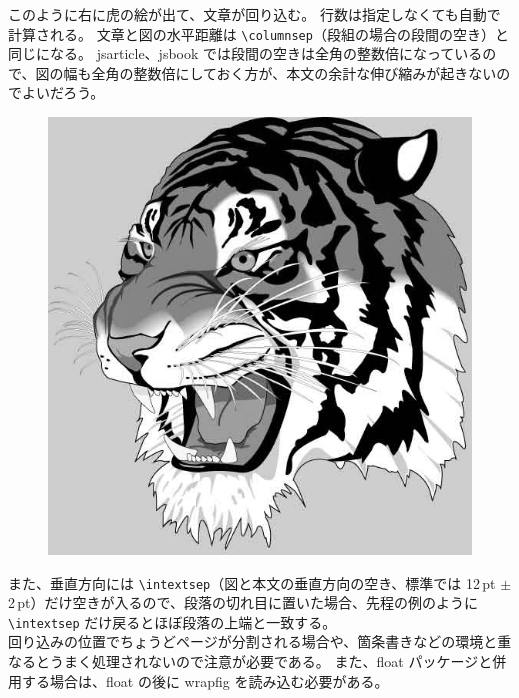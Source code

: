 このように右に虎の絵が出て、文章が回り込む。
行数は指定しなくても自動で計算される。
文章と図の水平距離は \verb`\columnsep`（段組の場合の段間の空き）と同じになる。
jsarticle、jsbook では段間の空きは全角の整数倍になっているので、図の幅も全角の整数倍にしておく方が、本文の余計な伸び縮みが起きないのでよいだろう。
\begin{figure}
  \vspace*{-\intextsep}
  \includegraphics[width=8zw]{./Fig/Fig09_01.PNG}
\end{figure}
また、垂直方向には \verb`\intextsep`（図と本文の垂直方向の空き、標準では 12\,pt $\pm$ 2\,pt）だけ空きが入るので、段落の切れ目に置いた場合、先程の例のように \verb`\intextsep` だけ戻るとほぼ段落の上端と一致する。\\

回り込みの位置でちょうどページが分割される場合や、箇条書きなどの環境と重なるとうまく処理されないので注意が必要である。
また、float パッケージと併用する場合は、float の後に wrapfig を読み込む必要がある。
